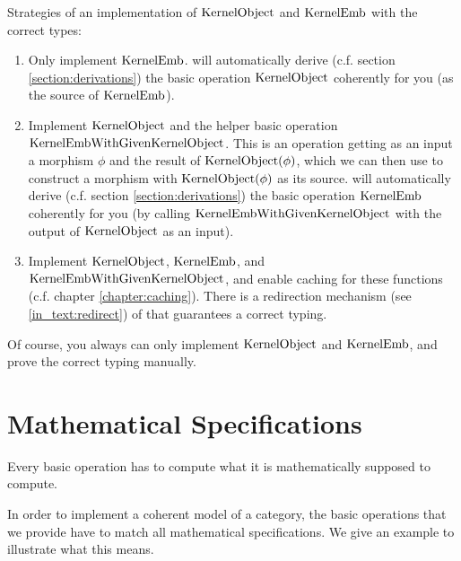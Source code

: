 \begin{example}
 Strategies of an implementation of $\mathrm{KernelObject}$ and $\mathrm{KernelEmb}$ with the correct types:
 \begin{enumerate}
  \item Only implement $\mathrm{KernelEmb}$. \CapPkg will automatically derive (c.f. section \ref{section:derivations}) the basic operation
        $\mathrm{KernelObject}$ coherently for you (as the source of $\mathrm{KernelEmb}$).
  \item Implement $\mathrm{KernelObject}$ and the helper basic operation $\mathrm{KernelEmbWithGivenKernelObject}$.
        This is an operation getting as an input a morphism $\phi$ and the result of $\mathrm{KernelObject}( \phi )$,
        which we can then use to construct a morphism with $\mathrm{KernelObject}( \phi )$ as its source. 
        \CapPkg will automatically derive (c.f. section \ref{section:derivations}) the basic operation
        $\mathrm{KernelEmb}$ coherently for you (by calling $\mathrm{KernelEmbWithGivenKernelObject}$ with the output of $\mathrm{KernelObject}$ as an input).
  \item Implement $\mathrm{KernelObject}$, $\mathrm{KernelEmb}$, and $\mathrm{KernelEmbWithGivenKernelObject}$, and enable caching for these functions (c.f. chapter \ref{chapter:caching}).
        There is a redirection mechanism (see \ref{in_text:redirect}) of \CapPkg that guarantees a correct typing.
 \end{enumerate}
 Of course, you always can only implement $\mathrm{KernelObject}$ and $\mathrm{KernelEmb}$, and prove the correct typing manually.
\end{example}



\section{Mathematical Specifications}

\begin{specification}
 Every basic operation has to compute what it is mathematically supposed to compute.
\end{specification} 

In order to implement a coherent model of a category, the basic operations that we provide have to match all mathematical
specifications. We give an example to illustrate what this means.

